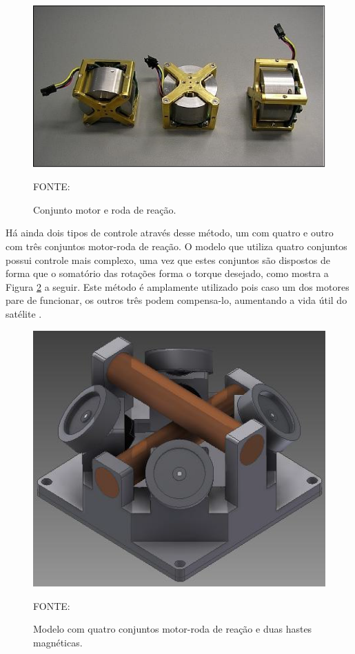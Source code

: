 \documentclass[
	12pt,				%
	openany,			%
	twoside,			%
	a4paper,			%
	english,			%
	french,				%
	spanish,			%
	brazil,				%
	oldfontcommands
	]{abntex2}
\begin{document}
\begin{figure}[th]
	\caption{Conjunto motor e roda de reação.}
	\centering
	\includegraphics[width=0.7\linewidth]{./figs/Shelf_Reaction_Wheel}
	
	\begin{small}
		FONTE: \cite{SWR}
	\end{small}
	\label{fig:SRW}
\end{figure}


Há ainda dois tipos de controle através desse método, um com quatro e outro com três conjuntos motor-roda de reação. O modelo que utiliza quatro conjuntos possui controle mais complexo, uma vez que estes conjuntos são dispostos de forma que o somatório das rotações forma o torque desejado, como mostra a Figura \ref{fig:ERW} a seguir. Este método é amplamente utilizado pois caso um dos motores pare de funcionar, os outros três podem compensa-lo, aumentando a vida útil do satélite \cite{Ericksson}.

\begin{figure}[th]
	\caption{Modelo com quatro conjuntos motor-roda de reação e duas hastes magnéticas.}
	\centering
	\includegraphics[width=0.6\linewidth]{./figs/Ericksson_Reaction_Wheel}
	
	\begin{small}
		FONTE: \cite{Ericksson}
	\end{small}
	\label{fig:ERW}
\end{figure}
\end{document}
